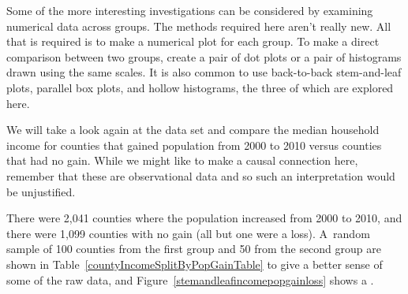 

Some of the more interesting investigations can be considered by examining numerical data across groups. The methods required here aren't really new. All that is required is to make a numerical plot for each group. To make a direct comparison between two groups, create a pair of dot plots or a pair of histograms drawn using the same scales. It is also common to use back-to-back stem-and-leaf plots, parallel box plots, and hollow histograms, the three of which are explored here.

We will take a look again at the  data set and compare the median household income for counties that gained population from 2000 to 2010 versus counties that had no gain. While we might like to make a causal connection here, remember that these are observational data and so such an interpretation would be unjustified.

There were 2,041 counties where the population increased from 2000 to 2010, and there were 1,099 counties with no gain (all but one were a loss). A~random sample of 100 counties from the first group and 50 from the second group are shown in Table~\ref{countyIncomeSplitByPopGainTable} to give a better sense of some of the raw data, and Figure~\ref{stemandleafincomepopgainloss} shows a .

